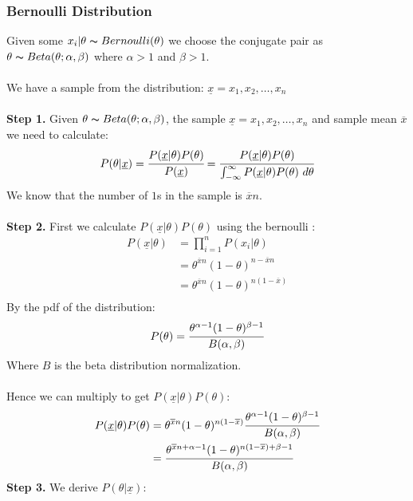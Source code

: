 \documentclass{report}
\begin{document}
\subsubsection*{Bernoulli Distribution}
Given some $x_i|\theta \thicksim Bernoulli(\theta)$ we choose the conjugate pair as $\theta \thicksim Beta(\theta; \alpha, \beta)$ where $\alpha> 1$ and $\beta > 1$.
\\
\\ We have a sample from the distribution: $\underline{x} = x_1, x_2, \dots, x_n$
\\
\\ \textbf{Step 1.} Given $\theta \thicksim Beta(\theta; \alpha, \beta)$, the sample $\underline{x} = x_1, x_2, \dots, x_n$ and sample mean $\overline{x}$
we need to calculate:
\[P(\theta|\underline{x}) = \cfrac{P(\underline{x}|\theta)P(\theta)}{P(\underline{x})} = \cfrac{P(\underline{x}|\theta)P(\theta)}{\int_{-\infty}^\infty P(\underline{x}|\theta)P(\theta) \ d\theta}\]
We know that the number of $1$s in the sample is $\overline{x}n$.
\\
\\ \textbf{Step 2.} First we calculate $P(\underline{x}|\theta)P(\theta)$ using the bernoulli :
\[\begin{split}
		P(\underline{x}|\theta) &= \prod_{i=1}^n P(x_i|\theta) \\
		&= \theta^{\overline{x}n}(1-\theta)^{n - \overline{x}n} \\
		&= \theta^{\overline{x}n}(1-\theta)^{n(1 - \overline{x})} \\
	\end{split}\]
By the pdf of the  distribution:
\[P(\theta) = \cfrac{\theta^{\alpha - 1}(1 - \theta)^{\beta - 1}}{B(\alpha,\beta)}\]
Where $B$ is the beta distribution normalization.
\\
\\ Hence we can multiply to get $P(\underline{x}|\theta)P(\theta)$:
\[\begin{split}
		P(\underline{x}|\theta)P(\theta) &= \theta^{\overline{x}n}(1-\theta)^{n(1 - \overline{x})}\cfrac{\theta^{\alpha - 1}(1 - \theta)^{\beta - 1}}{B(\alpha,\beta)} \\
		&= \cfrac{\theta^{\overline{x}n + \alpha - 1}(1 - \theta)^{n(1 - \overline{x}) + \beta - 1}}{B(\alpha,\beta)} \\
	\end{split}\]
\textbf{Step 3.} We derive $P(\theta|\underline{x})$:
\end{document}
